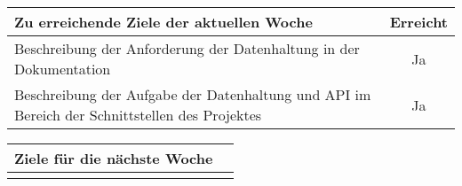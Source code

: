 \begin{tabularx}{\textwidth}{Xc}
    \arrayrulecolor{OliveGreen}
    \toprule
    {\bfseries Zu erreichende Ziele der aktuellen Woche} & {\bfseries Erreicht} \\
    \midrule[2pt]
    Beschreibung der Anforderung der Datenhaltung in der
    Dokumentation  &  Ja  \\
    \rowcolor{OliveGreen!15}
    Beschreibung der Aufgabe der Datenhaltung und API im Bereich der 
    Schnittstellen des Projektes  &  Ja  \\
    \bottomrule[2pt]
\end{tabularx}
%
\vspace{1cm}
%
\begin{tabularx}{\textwidth}{Xc}
    \arrayrulecolor{OliveGreen}
    \toprule
    {\bfseries Ziele für die nächste Woche}              &                      \\
    \midrule[2pt]
    \rowcolor{OliveGreen!15}
\end{tabularx}
